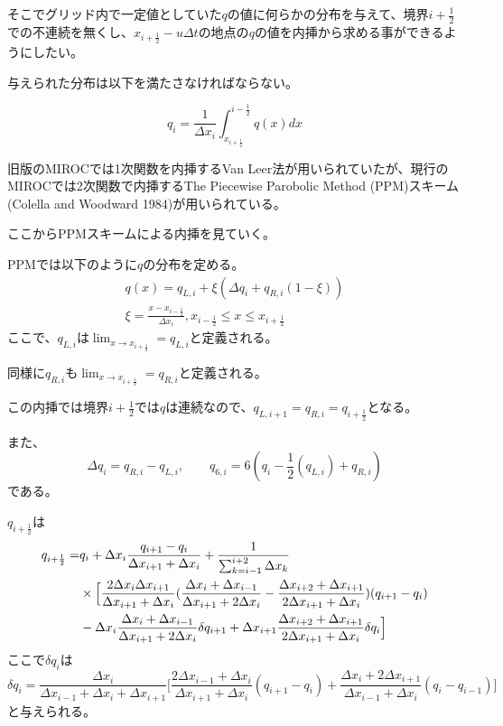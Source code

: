 \documentclass{jsbook}
\begin{document}
そこでグリッド内で一定値としていた$q$の値に何らかの分布を与えて、境界$i+\frac{1}{2}$での不連続を無くし、$x_{i+\frac{1}{2}}-u\Delta t$の地点の$q$の値を内挿から求める事ができるようにしたい。

与えられた分布は以下を満たさなければならない。

\begin{equation}
  q_{i}=\frac{1}{\Delta x_{i}} \int_{x_{i+\frac{1}{2}}}^{i-\frac{1}{2}} q(x) dx
\end{equation}

旧版のMIROCでは1次関数を内挿するVan Leer法が用いられていたが、現行のMIROCでは2次関数で内挿するThe Piecewise Parobolic Method (PPM)スキーム(Colella and Woodward 1984)が用いられている。

ここからPPMスキームによる内挿を見ていく。

PPMでは以下のように$q$の分布を定める。
\begin{equation}
\begin{split}
\label{a4}
  q(x)=q_{L,i}+\xi (\Delta q_{i}+q_{R,i}(1-\xi))\\
  \xi=\frac{x-x_{i-\frac{1}{2}}}{\Delta x_{i}},  x_{i-\frac{1}{2}}\leq x \leq x_{i+\frac{1}{2}}
  \end{split}
\end{equation}
ここで、$q_{L,i}$は$\lim_{x \to x_{i+\frac{1}{2}}}=q_{L,i}$と定義される。

同様に$q_{R,i}$も$\lim_{x \to x_{i+\frac{1}{2}}}=q_{R,i}$と定義される。

この内挿では境界$i+\frac{1}{2}$では$q$は連続なので、$q_{L,i+1}=q_{R,i}=q_{i+\frac{1}{2}}$となる。

また、
\begin{equation}
  \Delta q_{i}=q_{R,i}-q_{L,i},\qquad q_{6,i}=6(q_{i}-\frac{1}{2}(q_{L,i})+q_{R,i})
\end{equation}
である。

$q_{i+\frac{1}{2}}$は
\begin{equation}
  \label{a3}
  \begin{split}
    q_{i+\frac{1}{2}}=&q_{i}+\Delta x_{i} \frac{q_{i+1}-q_{i}}{\Delta x_{i+1}+\Delta x_{i}}+\frac{1}{\sum_{k=i-1}^{i+2}\Delta x_{k}}\\
    &\times \Bigl[\frac{2\Delta x_{i}\Delta x_{i+1}}{\Delta x_{i+1}+\Delta x_{i}}(\frac{\Delta x_{i}+\Delta x_{i-1}}{\Delta x_{i+1}+2\Delta x_{i}}-\frac{\Delta x_{i+2}+\Delta x_{i+1}}{2\Delta x_{i+1}+\Delta x_{i}})(q_{i+1}-q_{i})\\
     & -\Delta x_{i}\frac{\Delta x_{i}+\Delta x_{i-1}}{\Delta x_{i+1}+2\Delta x_{i}} \delta q_{i+1}+\Delta x_{i+1} \frac{\Delta x_{i+2}+\Delta x_{i+1}}{2\Delta x_{i+1}+\Delta x_{i}} \delta q_{i}\Bigr]
  \end{split}
\end{equation}
ここで$\delta q_{i}$は
\begin{equation}
  \delta q_{i}=\frac{\Delta x_{i}}{\Delta x_{i-1}+\Delta x_{i}+\Delta x_{i+1}}\biggl[\frac{2\Delta x_{i-1}+\Delta x_{i}}{\Delta x_{i+1}+\Delta x_{i}}(q_{i+1}-q_{i})+\frac{\Delta x_{i}+2\Delta x_{i+1}}{\Delta x_{i-1}+\Delta x_{i}}(q_{i}-q_{i-1})\biggr]
\end{equation}
と与えられる。
\end{document}

